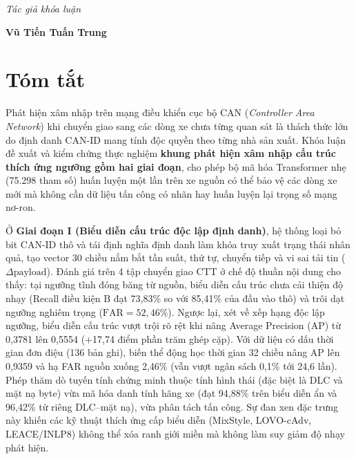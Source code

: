 \documentclass[12pt, a4paper, reqno, oneside]{book}
\newcommand\chap[1]{%
  \clearpage\phantomsection%
  \chapter*{#1}%
  \addcontentsline{toc}{chapter}{#1}%
  \markboth{#1}{}%
}
\begin{document}
\begin{flushright}
{\it Tác giả khóa luận}
\hskip 1.5cm\quad

\vskip 2cm
{\bf Vũ Tiến Tuấn Trung}  \quad\ \quad
\end{flushright}

\newpage

\chap{Tóm tắt}
\vspace{-10pt}

Phát hiện xâm nhập trên mạng điều khiển cục bộ CAN (\textit{Controller Area Network}) khi chuyển giao sang các dòng xe chưa từng quan sát là thách thức lớn do định danh CAN-ID mang tính độc quyền theo từng nhà sản xuất. Khóa luận đề xuất và kiểm chứng thực nghiệm \textbf{khung phát hiện xâm nhập cấu trúc thích ứng ngưỡng gồm hai giai đoạn}, cho phép bộ mã hóa Transformer nhẹ (75.298 tham số) huấn luyện một lần trên xe nguồn có thể bảo vệ các dòng xe mới mà không cần dữ liệu tấn công có nhãn hay huấn luyện lại trọng số mạng nơ-ron.

Ở \textbf{Giai đoạn I (Biểu diễn cấu trúc độc lập định danh)}, hệ thống loại bỏ bit CAN-ID thô và tái định nghĩa định danh làm khóa truy xuất trạng thái nhân quả, tạo vector 30 chiều nắm bắt tần suất, thứ tự, chuyển tiếp và vi sai tải tin ($\Delta\text{payload}$). Đánh giá trên 4 tập chuyển giao CTT ở chế độ thuần nội dung cho thấy: tại ngưỡng tĩnh đóng băng từ nguồn, biểu diễn cấu trúc chưa cải thiện độ nhạy (Recall điều kiện B đạt 73,83\% so với 85,41\% của đầu vào thô) và trôi dạt ngưỡng nghiêm trọng ($\text{FAR} = 52{,}46\%$). Ngược lại, xét về xếp hạng độc lập ngưỡng, biểu diễn cấu trúc vượt trội rõ rệt khi nâng Average Precision (AP) từ 0,3781 lên 0,5554 (+17,74 điểm phần trăm ghép cặp). Với dữ liệu có dấu thời gian đơn điệu (136 bản ghi), biến thể động học thời gian 32 chiều nâng AP lên 0,9359 và hạ FAR nguồn xuống 2,46\% (vẫn vượt ngân sách 0,1\% tới 24,6 lần). Phép thăm dò tuyến tính chứng minh thuộc tính hình thái (đặc biệt là DLC và mặt nạ byte) vừa mã hóa danh tính hãng xe (đạt 94,88\% trên biểu diễn ẩn và 96,42\% từ riêng DLC--mặt nạ), vừa phân tách tấn công. Sự đan xen đặc trưng này khiến các kỹ thuật thích ứng cấp biểu diễn (MixStyle, LOVO-cAdv, LEACE/INLP8) không thể xóa ranh giới miền mà không làm suy giảm độ nhạy phát hiện.
\end{document}
